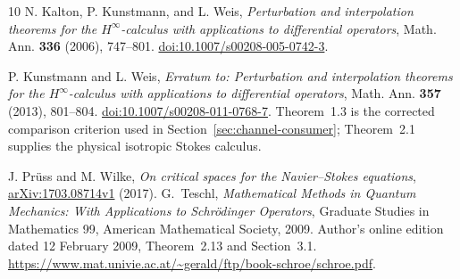 \documentclass[11pt]{article}
\numberwithin{equation}{section}
\theoremstyle{remark}
\begin{document}
\begin{thebibliography}{10}
N. Kalton, P. Kunstmann, and L. Weis,
\emph{Perturbation and interpolation theorems for the $H^\infty$-calculus
with applications to differential operators},
Math. Ann. \textbf{336} (2006), 747--801.
\href{https://doi.org/10.1007/s00208-005-0742-3}{doi:10.1007/s00208-005-0742-3}.

P. Kunstmann and L. Weis,
\emph{Erratum to: Perturbation and interpolation theorems for the
$H^\infty$-calculus with applications to differential operators},
Math. Ann. \textbf{357} (2013), 801--804.
\href{https://doi.org/10.1007/s00208-011-0768-7}{doi:10.1007/s00208-011-0768-7}.
Theorem~1.3 is the corrected comparison criterion used in
Section~\ref{sec:channel-consumer}; Theorem~2.1 supplies the physical
isotropic Stokes calculus.

J. Pr\"uss and M. Wilke,
\emph{On critical spaces for the Navier--Stokes equations},
\href{https://arxiv.org/abs/1703.08714v1}{arXiv:1703.08714v1} (2017).
G.~Teschl,
\emph{Mathematical Methods in Quantum Mechanics: With Applications to
Schr\"odinger Operators}, Graduate Studies in Mathematics 99,
American Mathematical Society, 2009. Author's online edition dated
12 February 2009, Theorem~2.13 and Section~3.1.
\url{https://www.mat.univie.ac.at/~gerald/ftp/book-schroe/schroe.pdf}.

\end{thebibliography}
\end{document}
